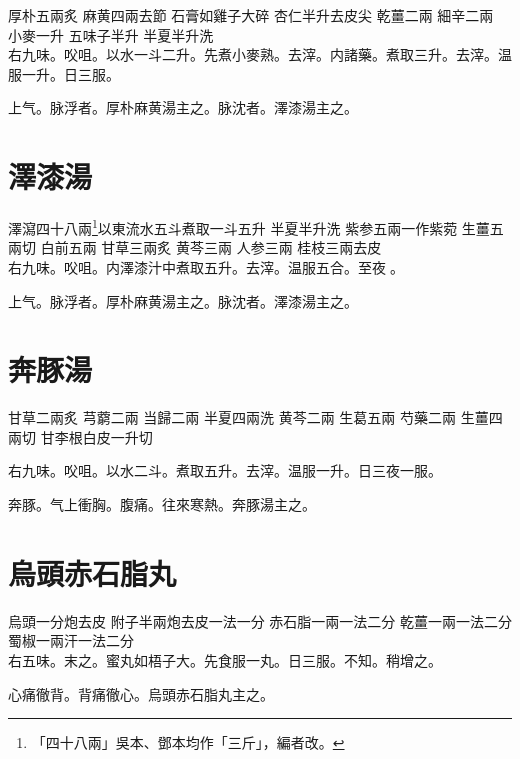 厚朴{\scriptsize 五兩炙} 麻黄{\scriptsize 四兩去節} 石膏{\scriptsize 如雞子大碎} 杏仁{\scriptsize 半升去皮尖} 乾薑{\scriptsize 二兩} 細辛{\scriptsize 二兩} 小麥{\scriptsize 一升} 五味子{\scriptsize 半升} 半夏{\scriptsize 半升洗}\\
右九味。㕮咀。以水一斗二升。先煮小麥熟。去滓。内諸藥。煮取三升。去滓。温服一升。日三服。

上气。脉浮者。厚朴麻黄湯主之。脉沈者。澤漆湯主之。

\section{澤漆湯}

澤瀉{\scriptsize 四十八兩\footnote{「四十八兩」吳本、鄧本均作「三斤」，編者改。}以東流水五斗煮取一斗五升} 半夏{\scriptsize 半升洗} 紫参{\scriptsize 五兩一作紫菀} 生薑{\scriptsize 五兩切} 白前{\scriptsize 五兩} 甘草{\scriptsize 三兩炙} 黄芩{\scriptsize 三兩} 人参{\scriptsize 三兩} 桂枝{\scriptsize 三兩去皮}\\
右九味。㕮咀。内澤漆汁中煮取五升。去滓。温服五合。至夜{\sungii 𥁞}。

上气。脉浮者。厚朴麻黄湯主之。脉沈者。澤漆湯主之。

\section{奔豚湯}

甘草{\scriptsize 二兩{\khaai 炙}} 芎藭{\scriptsize 二兩} 当歸{\scriptsize 二兩} 半夏{\scriptsize 四兩{\khaai 洗}} 黄芩{\scriptsize 二兩} 生葛{\scriptsize 五兩} 芍藥{\scriptsize 二兩} 生薑{\scriptsize 四兩{\khaai 切}} 甘李根白皮{\scriptsize 一升{\khaai 切}}

右九味。{\khaai 㕮咀。}以水二斗。煮取五升。{\khaai 去滓。}温服一升。日三夜一服。

奔豚。气上衝胸。腹痛。往來寒熱。奔豚湯主之。

\section{烏頭赤石脂丸}

烏頭{\scriptsize 一分炮去皮} 附子{\scriptsize 半兩炮去皮一法一分} 赤石脂{\scriptsize 一兩一法二分} 乾薑{\scriptsize 一兩一法二分} 蜀椒{\scriptsize 一兩汗一法二分}\\
右五味。末之。蜜丸如梧子大。先食服一丸。日三服。不知。稍增之。

心痛徹背。背痛徹心。烏頭赤石脂丸主之。

